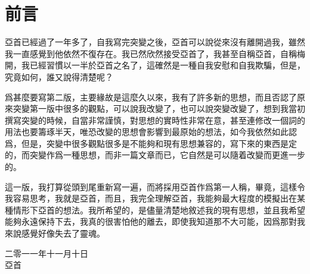 \chapter*{前言}
亞首已經過了一年多了，自我寫完突變之後，亞首可以說從來沒有離開過我，雖然我一直感覺到他依然不復存在。我已然欣然接受亞首了，我甚至自稱亞首，自稱梅開，我已經習慣以一半於亞首之名了，這確然是一種自我安慰和自我欺騙，但是，究竟如何，誰又說得清楚呢？

爲甚麼要寫第二版，主要緣故是這麼久以來，我有了許多新的思想，而且否認了原來突變第一版中很多的觀點，可以說我改變了，也可以說突變改變了，想到我當初撰寫突變的時候，自當非常謹慎，對思想的實時性非常在意，甚至連修改一個詞的用法也要籌琢半天，唯恐改變的思想會影響到最原始的想法，如今我依然如此認爲，但是，突變中很多觀點很多是不能夠和現有思想兼容的，寫下來的東西是定的，而突變作爲一種思想，而非一篇文章而已，它自然是可以隨着改變而更進一步的。

這一版，我打算從頭到尾重新寫一遍，而將採用亞首作爲第一人稱，畢竟，這樣令我容易思考，我就是亞首，而且，我完全理解亞首，我能夠最大程度的模擬出在某種情形下亞首的想法。我所希望的，是儘量清楚地敘述我的現有思想，並且我希望能夠永遠保持下去，我真的很害怕他的離去，即使我知道那不大可能，因爲那對我來說感覺好像失去了靈魂。

\begin{flushright}
二零一一年十一月十日\\
亞首
\end{flushright}

